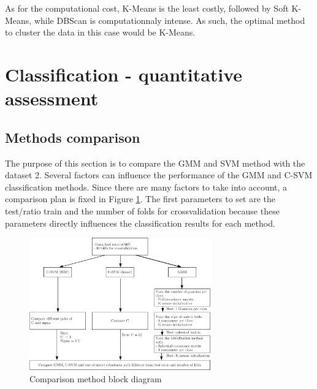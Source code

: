 \documentclass[a4paper,10pt]{article}
\begin{document}
As for the computational cost, K-Means is the least costly, followed by Soft K-Means, while DBScan is computationnaly intense. As such, the optimal method to cluster the data in this case would be K-Means.



\section{Classification - quantitative assessment}

\subsection{Methods comparison}

The purpose of this section is to compare the GMM and SVM method with the dataset 2. Several factors can influence the performance of the GMM and C-SVM classification methods. Since there are many factors to take into account, a comparison plan is fixed in Figure \ref{fig:comparison-block-diag}. The first parameters to set are the test/ratio train and the number of folds for crossvalidation because these parameters directly influences the classification results for each method.


\begin{figure}[H]
	\centering
	\includegraphics[width=0.7\textwidth]{pictures/comparison-block-diag}
	\caption{Comparison method block diagram}
	\label{fig:comparison-block-diag}
\end{figure}
\end{document}
